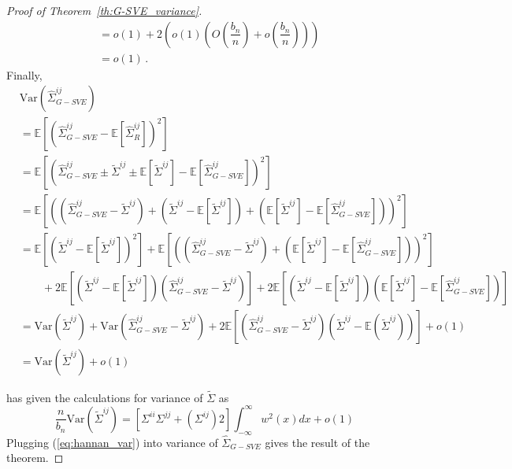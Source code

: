 \documentclass[11pt]{article}
\newcommand{\E}{\mathbb{E}}
\newcommand{\Var}{\text{Var}}
\theoremstyle{remark}
\begin{document}
\begin{proof}[Proof of Theorem~\ref{th:G-SVE_variance}]
\begin{align*}
& = o(1) + 2\left(o(1) \left(O\left( \dfrac{b_n}{n}\right)  + o\left( \dfrac{b_n}{n}\right) \right)  \right) \\ 
& = o(1)\,.
\end{align*}
%
Finally,
\begin{align*}
 & \Var\left(\hat{\Sigma}_{G-SVE}^{ij} \right)\\
  & = \E \left[ \left(\hat{\Sigma}_{G-SVE}^{ij}  - \E \left[\hat{\Sigma}_{R}^{ij}  \right] \right)^2 \right]\\
& = \E \left[ \left(\hat{\Sigma}_{G-SVE}^{ij} \pm \tilde{\Sigma}^{ij} \pm \E \left[ \tilde{\Sigma}^{ij}\right] - \E \left[\hat{\Sigma}_{G-SVE}^{ij}  \right] \right)^2 \right]\\
& = \E\left[ \left( \left(\hat{\Sigma}_{G-SVE}^{ij} - \tilde{\Sigma}^{ij} \right) + \left(\tilde{\Sigma}^{ij}  - \E\left[\tilde{\Sigma}^{ij}\right]\right) + \left(\E\left[\tilde{\Sigma}^{ij}\right] - \E \left[\hat{\Sigma}_{G-SVE}^{ij}  \right] \right)  \right)^2 \right] \\ 
& =  \E\left[ \left(\tilde{\Sigma}^{ij}  - \E\left[\tilde{\Sigma}^{ij}\right]\right)^2 \right] + \E \left[ \left(\left(\hat{\Sigma}_{G-SVE}^{ij} - \tilde{\Sigma}^{ij} \right) + \left(\E\left[\tilde{\Sigma}^{ij}\right] - \E \left[\hat{\Sigma}_{G-SVE}^{ij}  \right] \right) \right)^2 \right] \\
& \quad \quad + 2\E\left[\left(\tilde{\Sigma}^{ij}  - \E\left[\tilde{\Sigma}^{ij}\right]\right) \left(\hat{\Sigma}_{G-SVE}^{ij} - \tilde{\Sigma}^{ij} \right)\right] + 2 \E\left[\left(\tilde{\Sigma}^{ij}  - \E\left[\tilde{\Sigma}^{ij}\right]\right) \left(\E \left[\tilde{\Sigma}^{ij}\right] - \E \left[\hat{\Sigma}_{G-SVE}^{ij}  \right] \right)\right]\\
& = \Var\left( \tilde{\Sigma}^{ij}\right) + \Var\left(\hat{\Sigma}_{G-SVE}^{ij} - \tilde{\Sigma}^{ij} \right) + 2 \E\left[ \left(\hat{\Sigma}_{G-SVE}^{ij} -  \tilde{\Sigma}^{ij} \right) \left(\tilde{\Sigma}^{ij}  - \E \left( \tilde{\Sigma}^{ij} \right) \right) \right] + o(1)\\
& = \Var\left( \tilde{\Sigma}^{ij}\right) + o(1)
\end{align*}

\cite{hannan2009multiple} has given the calculations for variance of $\tilde{\Sigma}$ as 
\begin{equation} \label{eq:hannan_var}
\dfrac{n}{b_n}\Var(\tilde{\Sigma}^{ij}) = [\Sigma^{ii}\Sigma^{jj} + \left(\Sigma^{ij} \right)2]\int_{-\infty}^{\infty}w^2(x)dx + o(1)    
\end{equation}
Plugging (\ref{eq:hannan_var}) into variance of $\hat{\Sigma}_{G-SVE}$ gives the result of the theorem.
 
\end{proof}
\end{document}
